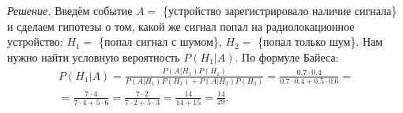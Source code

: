 \textit{Решение.}
Введём событие $A =$ \{устройство зарегистрировало наличие сигнала\} и сделаем гипотезы о том,
какой же сигнал попал на радиолокационное устройство: $H_1 =$ \{попал сигнал с шумом\}, $H_2 =$ \{попал только шум\}.
Нам нужно найти условную вероятность $P \left( \left. H_1 \right| A \right) $.
По формуле Байеса:
\begin{equation*}
\begin{split}
P \left( \left. H_1 \right| A \right) =
\frac{P \left( \left. A \right| H_1 \right) P \left( H_1 \right) }{P \left( \left. A \right| H_1 \right) P \left( H_1 \right) +
P \left( \left. A \right| H_2 \right) P \left( H_2 \right) } =
\frac{0.7 \cdot 0.4}{0.7 \cdot 0.4 + 0.5 \cdot 0.6} = \\
= \frac{7 \cdot 4}{7 \cdot 4 + 5 \cdot 6} =
\frac{7 \cdot 2}{7 \cdot 2 + 5 \cdot 3} =
\frac{14}{14 + 15} =
\frac{14}{29}.
\end{split}
\end{equation*}
